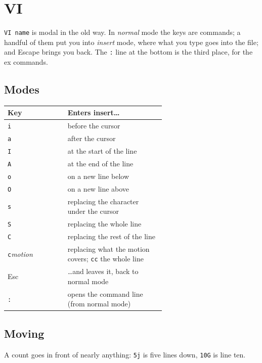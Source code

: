 \section{VI}
\verb|VI name| is modal in the old way. In \emph{normal} mode the keys
are commands; a handful of them put you into \emph{insert} mode, where
what you type goes into the file; and Escape brings you back. The
\verb|:| line at the bottom is the third place, for the ex commands.

\subsection*{Modes}
\begin{center}
\small
\begin{tabular}{@{}l >{\raggedright\arraybackslash}p{0.62\linewidth}@{}}
\toprule
\textbf{Key} & \textbf{Enters insert\ldots} \\
\midrule
\texttt{i} & before the cursor \\
\texttt{a} & after the cursor \\
\texttt{I} & at the start of the line \\
\texttt{A} & at the end of the line \\
\texttt{o} & on a new line below \\
\texttt{O} & on a new line above \\
\texttt{s} & replacing the character under the cursor \\
\texttt{S} & replacing the whole line \\
\texttt{C} & replacing the rest of the line \\
\texttt{c}\emph{motion} & replacing what the motion covers; \texttt{cc} the whole line \\
\midrule
Esc & \ldots and leaves it, back to normal mode \\
\texttt{:} & opens the command line (from normal mode) \\
\bottomrule
\end{tabular}
\end{center}

\subsection*{Moving}
A count goes in front of nearly anything: \verb|5j| is five lines down,
\verb|10G| is line ten.

